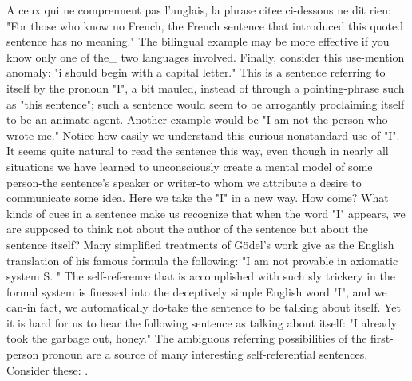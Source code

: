 A ceux qui ne comprennent pas l'anglais, la phrase citee ci-dessous ne dit rien: "For those who know no French, the French sentence that introduced this quoted sentence has no meaning." 
The bilingual example may be more effective if you know only one of the_ two languages involved. Finally, consider this use-mention anomaly: "i should begin with a capital letter." This is a sentence referring to itself by the pronoun "I", a bit mauled, instead of through a pointing-phrase such as "this sentence"; such a sentence would seem to be arrogantly proclaiming itself to be an animate agent. Another example would be "I am not the person who wrote me." Notice how easily we understand this curious nonstandard use of "I". It seems quite natural to read the sentence this way, even though in nearly all situations we have learned to unconsciously create a mental model of some person-the sentence's speaker or writer-to whom we attribute a desire to communicate some idea. Here we take the "I" in a new way. How come? What kinds of cues in a sentence make us recognize that when the word "I" appears, we are supposed to think not about the author of the sentence but about the sentence itself? 
\separator
Many simplified treatments of Gödel’s work give as the English translation of his famous formula the following: "I am not provable in axiomatic system S. " The self-reference that is accomplished with such sly trickery in the formal system is finessed into the deceptively simple English word "I", and we can-in fact, we automatically do-take the sentence to be talking about itself. Yet it is hard for us to hear the following sentence as talking about itself: "I already took the garbage out, honey." The ambiguous referring possibilities of the first-person pronoun are a source of many interesting self-referential sentences. Consider these: . 



